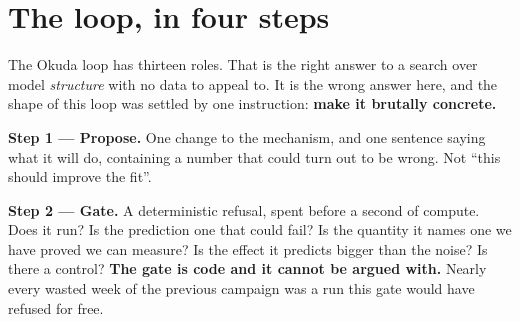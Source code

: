 \documentclass[11pt,a4paper]{article}
\begin{document}
\section{The loop, in four steps}

The Okuda loop has thirteen roles. That is the right answer to a search over model \emph{structure}
with no data to appeal to. It is the wrong answer here, and the shape of this loop was settled by
one instruction: \textbf{make it brutally concrete.}

\begin{center}
\end{center}

\textbf{Step 1 --- Propose.} One change to the mechanism, and one sentence saying what it will do,
containing a number that could turn out to be wrong. Not ``this should improve the fit''.

\textbf{Step 2 --- Gate.} A deterministic refusal, spent before a second of compute. Does it run? Is
the prediction one that could fail? Is the quantity it names one we have proved we can measure? Is
the effect it predicts bigger than the noise? Is there a control? \textbf{The gate is code and it
cannot be argued with.} Nearly every wasted week of the previous campaign was a run this gate would
have refused for free.
\end{document}
